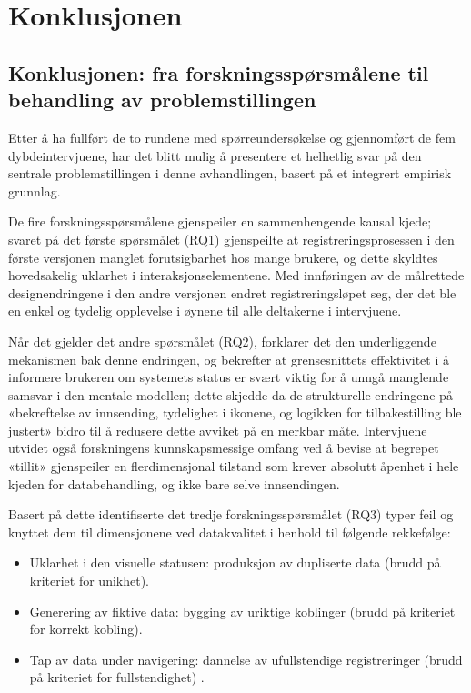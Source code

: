 \chapter{Konklusjonen}

\section{Konklusjonen: fra forskningsspørsmålene til behandling av problemstillingen}

Etter å ha fullført de to rundene med spørreundersøkelse og gjennomført de fem dybdeintervjuene, har det blitt mulig å presentere et helhetlig svar på den sentrale problemstillingen i denne avhandlingen, basert på et integrert empirisk grunnlag.

De fire forskningsspørsmålene gjenspeiler en sammenhengende kausal kjede; svaret på det første spørsmålet (RQ1) gjenspeilte at registreringsprosessen i den første versjonen manglet forutsigbarhet hos mange brukere, og dette skyldtes hovedsakelig uklarhet i interaksjonselementene. Med innføringen av de målrettede designendringene i den andre versjonen endret registreringsløpet seg, der det ble en enkel og tydelig opplevelse i øynene til alle deltakerne i intervjuene.

Når det gjelder det andre spørsmålet (RQ2), forklarer det den underliggende mekanismen bak denne endringen, og bekrefter at grensesnittets effektivitet i å informere brukeren om systemets status er svært viktig for å unngå manglende samsvar i den mentale modellen; dette skjedde da de strukturelle endringene på «bekreftelse av innsending, tydelighet i ikonene, og logikken for tilbakestilling ble justert» bidro til å redusere dette avviket på en merkbar måte. Intervjuene utvidet også forskningens kunnskapsmessige omfang ved å bevise at begrepet «tillit» gjenspeiler en flerdimensjonal tilstand som krever absolutt åpenhet i hele kjeden for databehandling, og ikke bare selve innsendingen.

Basert på dette identifiserte det tredje forskningsspørsmålet (RQ3) typer feil og knyttet dem til dimensjonene ved datakvalitet i henhold til følgende rekkefølge:

\begin{itemize}
    \item Uklarhet i den visuelle statusen: produksjon av dupliserte data (brudd på kriteriet for unikhet).
    \item Generering av fiktive data: bygging av uriktige koblinger (brudd på kriteriet for korrekt kobling).
    \item Tap av data under navigering: dannelse av ufullstendige registreringer (brudd på kriteriet for fullstendighet) \cite{wang1996}.
\end{itemize}


